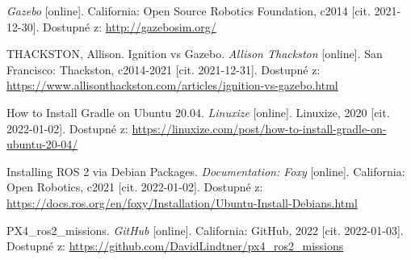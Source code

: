 \begin{thebibliography}{99}

\textit{Gazebo} [online]. California: Open Source Robotics Foundation, c2014 [cit. 2021-12-30]. Dostupné z: \href{http://gazebosim.org/}{http://gazebosim.org/}

THACKSTON, Allison. Ignition vs Gazebo. \textit{Allison Thackston} [online]. San Francisco: Thackston, c2014-2021 [cit. 2021-12-31]. Dostupné z: \href{https://www.allisonthackston.com/articles/ignition-vs-gazebo.html}{https://www.allisonthackston.com/articles/ignition-vs-gazebo.html}


How to Install Gradle on Ubuntu 20.04. \textit{Linuxize} [online]. Linuxize, 2020 [cit. 2022-01-02]. Dostupné z: \href{https://linuxize.com/post/how-to-install-gradle-on-ubuntu-20-04/}{https://linuxize.com/post/how-to-install-gradle-on-ubuntu-20-04/}



Installing ROS 2 via Debian Packages. \textit{Documentation: Foxy} [online]. California: Open Robotics, c2021 [cit. 2022-01-02]. Dostupné z: \href{https://docs.ros.org/en/foxy/Installation/Ubuntu-Install-Debians.html}{https://docs.ros.org/en/foxy/Installation/Ubuntu-Install-Debians.html}


PX4\_ros2\_missions. \textit{GitHub} [online]. California: GitHub, 2022 [cit. 2022-01-03]. Dostupné z: \href{https://github.com/DavidLindtner/px4\_ros2\_missions}{https://github.com/DavidLindtner/px4\_ros2\_missions}


\end{thebibliography}
